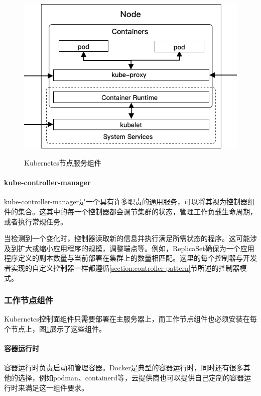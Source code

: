 \documentclass[macfonts,master]{njuthesis}
\begin{document}
\begin{figure}[h]
\begin{multicols}{2}
  \includegraphics[width=\linewidth]{pics/K8s-node-server-components.png}\\
  \caption{Kubernetes节点服务组件\cite{gorillaguide}}\label{fig:k8s-node}\par
\end{multicols}
\end{figure}





\paragraph{kube-controller-manager}
kube-controller-manager是一个具有许多职责的通用服务，可以将其视为控制器组件的集合。这其中的每一个控制器都会调节集群的状态，管理工作负载生命周期，或者执行常规任务\cite{gorillaguide}。

当检测到一个变化时，控制器读取新的信息并执行满足所需状态的程序。这可能涉及到扩大或缩小应用程序的规模，调整端点等。例如，ReplicaSet确保为一个应用程序定义的副本数量与当前部署在集群上的数量相匹配。这里的每个控制器与开发者实现的自定义控制器一样都遵循\ref{section:controller-pattern}节所述的控制器模式。

\subsubsection{工作节点组件}
Kubernetes控制面组件只需要部署在主服务器上，而工作节点组件也必须安装在每个节点上，图\ref{fig:k8s-node}展示了这些组件。

\paragraph{容器运行时}
容器运行时负责启动和管理容器。Docker是典型的容器运行时，同时还有很多其他的选择，例如podman、containerd等，云提供商也可以提供自己定制的容器运行时来满足这一组件要求。
\end{document}
